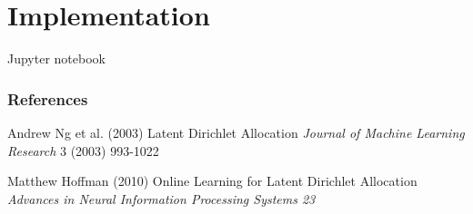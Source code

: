 \documentclass[10pt]{beamer}
\begin{document}
\section{Implementation}


\begin{frame}

\begin{center}
    Jupyter notebook
\end{center}

\end{frame}



\begin{frame}
\frametitle{References}
\footnotesize{
\begin{thebibliography}{99} %
 Andrew Ng et al. (2003)
\newblock Latent Dirichlet Allocation
\newblock \emph{Journal of Machine Learning Research} 3 (2003) 993-1022

 Matthew Hoffman (2010)
\newblock Online Learning for Latent Dirichlet Allocation
\newblock \emph{Advances in Neural Information Processing Systems 23} 


\end{thebibliography}
}
\end{frame}
\end{document}
